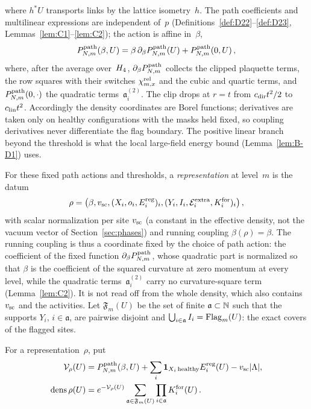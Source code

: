 where $h^*U$ transports links by the lattice isometry~$h$. The path coefficients and multilinear expressions are independent of~$p$ (Definitions~\ref{def:D22}--\ref{def:D23}, Lemmas~\ref{lem:C1}--\ref{lem:C2}); the action is affine in~$\beta$,
\begin{equation*}
P^{\mathrm{path}}_{N,m}(\beta,U)=\beta\,\partial_\beta P^{\mathrm{path}}_{N,m}(U)+P^{\mathrm{path}}_{N,m}(0,U)\,,
\end{equation*}
where, after the average over~$H_4$, $\partial_\beta P^{\mathrm{path}}_{N,m}$ collects the clipped plaquette terms, the row squares with their switches $\chi^{\rm rel}_{m,x}$ and the cubic and quartic terms, and $P^{\mathrm{path}}_{N,m}(0,\cdot)$ the quadratic terms~$\mathfrak a_i^{(2)}$. The clip drops at $r=t$ from $c_{\rm dir}t^2/2$ to $c_{\rm lin}t^2$. Accordingly the density coordinates are Borel functions; derivatives are taken only on healthy configurations with the masks held fixed, so coupling derivatives never differentiate the flag boundary. The positive linear branch beyond the threshold is what the local large-field energy bound (Lemma~\ref{lem:B-D1}) uses.

For these fixed path actions and thresholds, a \emph{representation} at level~$m$ is the datum
\begin{equation}\label{eq:I12-representation}
\rho=\bigl(\beta,v_{\rm sc},(X_i,o_i,E_i^{\rm reg})_i,
(Y_i,I_i,\mathcal E_i^{\rm extra},K_i^{\rm for})_i\bigr)\,,
\end{equation}
with scalar normalization per site $v_{\rm sc}$ (a constant in the effective density, not the vacuum vector of Section~\ref{sec:phases}) and running coupling $\beta(\rho)=\beta$. The running coupling is thus a coordinate fixed by the choice of path action: the coefficient of the fixed function $\partial_\beta P^{\mathrm{path}}_{N,m}$, whose quadratic part is normalized so that $\beta$ is the coefficient of the squared curvature at zero momentum at every level, while the quadratic terms~$\mathfrak a_i^{(2)}$ carry no curvature-square term (Lemma~\ref{lem:C2}). It is not read off from the whole density, which also contains $v_{\rm sc}$ and the activities. Let $\mathfrak F_m(U)$ be the set of finite $\mathfrak a\subset\mathbb{N}$ such that the supports $Y_i$, $i\in\mathfrak a$, are pairwise disjoint and $\bigcup_{i\in\mathfrak a}I_i=\operatorname{Flag}_m(U)$: the exact covers of the flagged sites.

\begin{definition}\label{def:D06}
For a representation~$\rho$, put
\begin{align*}
\mathcal V_\rho(U)&=P^{\mathrm{path}}_{N,m}(\beta,U)+\sum_i\mathbf1_{X_i\,\mathrm{healthy}}E_i^{\rm reg}(U)-v_{\rm sc}|\Lambda|,\\
\operatorname{dens}\rho(U)&=e^{-\mathcal V_\rho(U)}\sum_{\mathfrak a\in\mathfrak F_m(U)}\prod_{i\in\mathfrak a}K_i^{\rm for}(U)\,.
\end{align*}
\end{definition}

